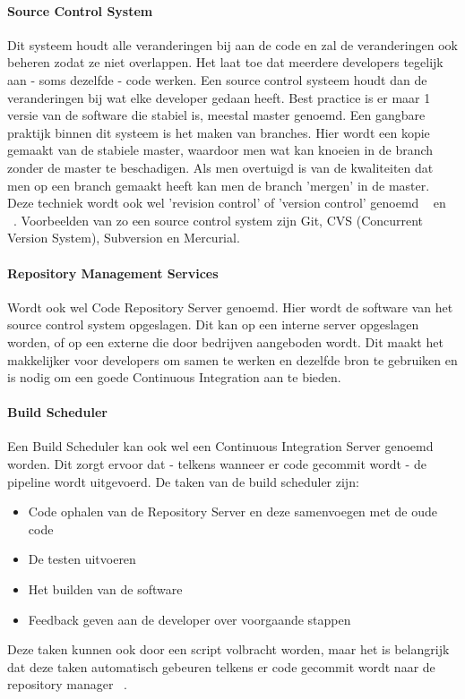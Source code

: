     \paragraph{Source Control System}
    Dit systeem houdt alle veranderingen bij aan de code en zal de veranderingen ook beheren zodat ze niet overlappen. Het laat toe dat meerdere developers tegelijk aan - soms dezelfde - code werken. Een source control systeem houdt dan de veranderingen bij wat elke developer gedaan heeft. Best practice is er maar 1 versie van de software die stabiel is, meestal master genoemd. Een gangbare praktijk binnen dit systeem is het maken van branches. Hier wordt een kopie gemaakt van de stabiele master, waardoor men wat kan knoeien in de branch zonder de master te beschadigen. Als men overtuigd is van de kwaliteiten dat men op een branch gemaakt heeft kan men de branch 'mergen' in de master. Deze techniek wordt ook wel 'revision control' of 'version control' genoemd ~\autocite{Skelton2014} en ~\autocite{Riti2018}.
    Voorbeelden van zo een source control system zijn Git, CVS (Concurrent Version System), Subversion en Mercurial.
    
    \paragraph{Repository Management Services}
    Wordt ook wel Code Repository Server genoemd. Hier wordt de software van het source control system opgeslagen. Dit kan op een interne server opgeslagen worden, of op een externe die door bedrijven aangeboden wordt. Dit maakt het makkelijker voor developers om samen te werken en dezelfde bron te gebruiken en is nodig om een goede Continuous Integration aan te bieden.
    
    \paragraph{Build Scheduler}
    Een Build Scheduler kan ook wel een Continuous Integration Server genoemd worden.
    Dit zorgt ervoor dat - telkens wanneer er code gecommit wordt - de pipeline wordt uitgevoerd. De taken van de build scheduler zijn: 
    \begin{itemize}
        \item Code ophalen van de Repository Server en deze samenvoegen met de oude code
        \item De testen uitvoeren
        \item Het builden van de software
        \item Feedback geven aan de developer over voorgaande stappen
    \end{itemize}
    Deze taken kunnen ook door een script volbracht worden, maar het is belangrijk dat deze taken automatisch gebeuren telkens er code gecommit wordt naar de repository manager ~\autocite{Riti2018}.
    
